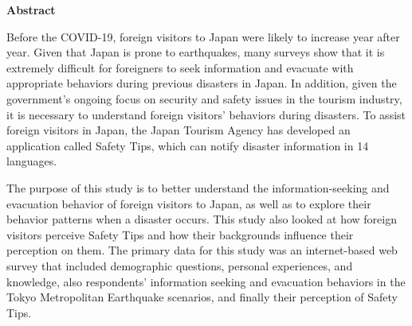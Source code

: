 
\begin{center}\textbf{Abstract}\end{center}

Before the COVID-19, foreign visitors to Japan were likely to increase year after year. Given that Japan is prone to earthquakes, many surveys show that it is extremely difficult for foreigners to seek information and evacuate with appropriate behaviors during previous disasters in Japan. In addition, given the government's ongoing focus on security and safety issues in the tourism industry, it is necessary to understand foreign visitors' behaviors during disasters. To assist foreign visitors in Japan, the Japan Tourism Agency has developed an application called Safety Tips, which can notify disaster information in 14 languages.

The purpose of this study is to better understand the information-seeking and evacuation behavior of foreign visitors to Japan, as well as to explore their behavior patterns when a disaster occurs. This study also looked at how foreign visitors perceive Safety Tips and how their backgrounds influence their perception on them. The primary data for this study was an internet-based web survey that included demographic questions, personal experiences, and knowledge, also respondents' information seeking and evacuation behaviors in the Tokyo Metropolitan Earthquake scenarios, and finally their perception of Safety Tips. 

